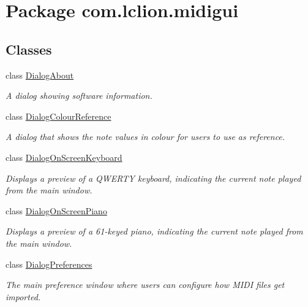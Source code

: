 \hypertarget{namespacecom_1_1lclion_1_1midigui}{\section{Package com.\+lclion.\+midigui}
\label{namespacecom_1_1lclion_1_1midigui}
}
\subsection*{Classes}
\begin{DoxyCompactItemize}
\item 
class \hyperlink{classcom_1_1lclion_1_1midigui_1_1_dialog_about}{Dialog\+About}
\begin{DoxyCompactList}\small\item\em A dialog showing software information. \end{DoxyCompactList}\item 
class \hyperlink{classcom_1_1lclion_1_1midigui_1_1_dialog_colour_reference}{Dialog\+Colour\+Reference}
\begin{DoxyCompactList}\small\item\em A dialog that shows the note values in colour for users to use as reference. \end{DoxyCompactList}\item 
class \hyperlink{classcom_1_1lclion_1_1midigui_1_1_dialog_on_screen_keyboard}{Dialog\+On\+Screen\+Keyboard}
\begin{DoxyCompactList}\small\item\em Displays a preview of a Q\+W\+E\+R\+T\+Y keyboard, indicating the current note played from the main window. \end{DoxyCompactList}\item 
class \hyperlink{classcom_1_1lclion_1_1midigui_1_1_dialog_on_screen_piano}{Dialog\+On\+Screen\+Piano}
\begin{DoxyCompactList}\small\item\em Displays a preview of a 61-\/keyed piano, indicating the current note played from the main window. \end{DoxyCompactList}\item 
class \hyperlink{classcom_1_1lclion_1_1midigui_1_1_dialog_preferences}{Dialog\+Preferences}
\begin{DoxyCompactList}\small\item\em The main preference window where users can configure how M\+I\+D\+I files get imported. \end{DoxyCompactList}\item 

\end{DoxyCompactItemize}

